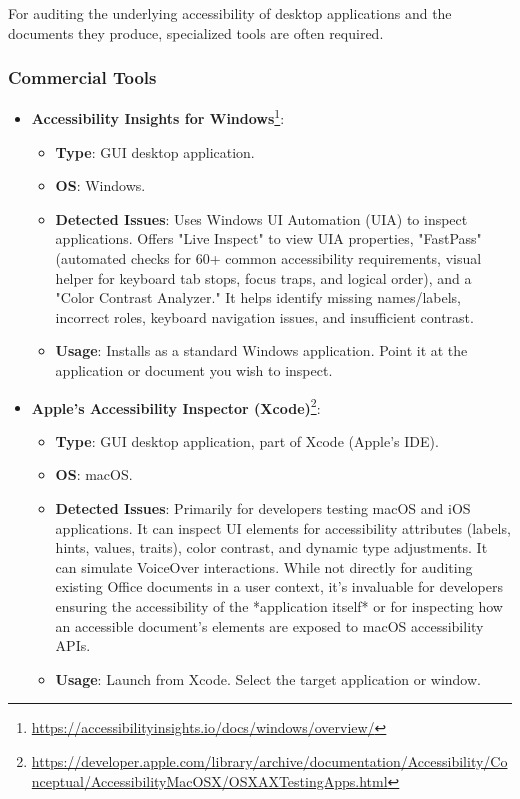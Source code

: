 For auditing the underlying accessibility of desktop applications and the documents they produce, specialized tools are often required.

\subsubsection{Commercial Tools}
\begin{itemize}
    \item \textbf{Accessibility Insights for Windows}\footnote{\url{https://accessibilityinsights.io/docs/windows/overview/}}:
        \begin{itemize}
            \item \textbf{Type}: GUI desktop application.
            \item \textbf{OS}: Windows.
            \item \textbf{Detected Issues}: Uses Windows UI Automation (UIA) to inspect applications. Offers "Live Inspect" to view UIA properties, "FastPass" (automated checks for 60+ common accessibility requirements, visual helper for keyboard tab stops, focus traps, and logical order), and a "Color Contrast Analyzer." It helps identify missing names/labels, incorrect roles, keyboard navigation issues, and insufficient contrast.
            \item \textbf{Usage}: Installs as a standard Windows application. Point it at the application or document you wish to inspect.
        \end{itemize}
    \item \textbf{Apple's Accessibility Inspector (Xcode)}\footnote{\url{https://developer.apple.com/library/archive/documentation/Accessibility/Conceptual/AccessibilityMacOSX/OSXAXTestingApps.html}}:
        \begin{itemize}
            \item \textbf{Type}: GUI desktop application, part of Xcode (Apple's IDE).
            \item \textbf{OS}: macOS.
            \item \textbf{Detected Issues}: Primarily for developers testing macOS and iOS applications. It can inspect UI elements for accessibility attributes (labels, hints, values, traits), color contrast, and dynamic type adjustments. It can simulate VoiceOver interactions. While not directly for auditing existing Office documents in a user context, it's invaluable for developers ensuring the accessibility of the *application itself* or for inspecting how an accessible document's elements are exposed to macOS accessibility APIs.
            \item \textbf{Usage}: Launch from Xcode. Select the target application or window.
        \end{itemize}
\end{itemize}

